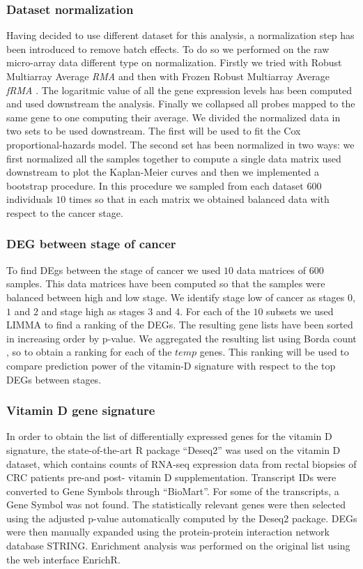\documentclass[fleqn,10pt]{SelfArx} %
\begin{document}
		\subsubsection{Dataset normalization}
		Having decided to use different dataset for this analysis, a normalization step has been introduced to remove batch effects.
		To do so we performed on the raw micro-array data different type on normalization.
		Firstly we tried with Robust Multiarray Average \emph{RMA} \cite{rma} and then with Frozen Robust Multiarray Average \emph{fRMA} \cite{frma}.
		The logaritmic value of all the gene expression levels has been computed and used downstream the analysis.
		Finally we collapsed all probes mapped to the same gene to one computing their average.
		We divided the normalized data in two sets to be used downstream.
		The first will be used to fit the Cox proportional-hazards model.
		The second set has been normalized in two ways: we first normalized all the samples together to compute a single data matrix used downstream to plot the Kaplan-Meier curves and then we implemented a bootstrap procedure.
		In this procedure we sampled from each dataset $600$ individuals $10$ times so that in each matrix we obtained balanced data with respect to the cancer stage.

		\subsubsection{DEG between stage of cancer}
		To find DEgs between the stage of cancer we used $10$ data matrices of $600$ samples.
		This data matrices have been computed so that the samples were balanced between high and low stage.
		We identify stage low of cancer as stages $0$, $1$ and $2$ and stage high as stages $3$ and $4$.
		For each of the $10$ subsets we used LIMMA \cite{limma} to find a ranking of the DEGs.
		The resulting gene lists have been sorted in increasing order by p-value.
		We aggregated the resulting list using Borda count \cite{borda}, so to obtain a ranking for each of the $temp$ genes.
		This ranking will be used to compare prediction power of the vitamin-D signature with respect to the top DEGs between stages.

		\subsubsection{Vitamin D gene signature}
		In order to obtain the list of differentially expressed genes for the vitamin D signature, the state-of-the-art R package “Deseq2” was used on the vitamin D dataset, which contains counts of RNA-seq expression data from rectal biopsies of CRC patients pre-and post- vitamin D supplementation. Transcript IDs were converted to Gene Symbols through “BioMart”. For some of the transcripts, a Gene Symbol was not found. The statistically relevant genes were then selected using the adjusted p-value automatically computed by the Deseq2 package. DEGs were then manually expanded using the protein-protein interaction network database STRING.
Enrichment analysis was performed on the original list using the web interface EnrichR.
\end{document}
